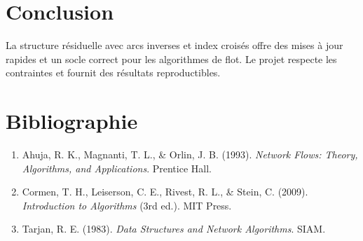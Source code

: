 \documentclass[11pt,a4paper]{article}
\begin{document}
\section{Conclusion}
La structure r\'esiduelle avec arcs inverses et index crois\'es offre des mises \`a jour rapides et un socle correct pour les algorithmes de flot. Le projet respecte les contraintes et fournit des r\'esultats reproductibles.

\section{Bibliographie}
\begin{enumerate}
    \item Ahuja, R. K., Magnanti, T. L., \& Orlin, J. B. (1993). \textit{Network Flows: Theory, Algorithms, and Applications}. Prentice Hall.
    \item Cormen, T. H., Leiserson, C. E., Rivest, R. L., \& Stein, C. (2009). \textit{Introduction to Algorithms} (3rd ed.). MIT Press.
    \item Tarjan, R. E. (1983). \textit{Data Structures and Network Algorithms}. SIAM.
\end{enumerate}
\end{document}

